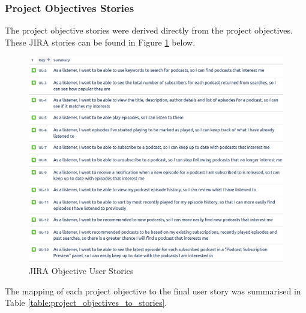 \documentclass[12pt]{article}
\begin{document}
\subsubsection{Project Objectives Stories} \label{sec:project_objectives_stories}

The project objective stories were derived directly from the project objectives. These JIRA stories can be found in Figure \ref{fig:jira_stories} below.

\begin{figure}[ht]
    \centering
    \includegraphics[width=\textwidth]{resources/objective_stories}
    \caption{JIRA Objective User Stories}
    \label{fig:jira_stories}
\end{figure}

The mapping of each project objective to the final user story was summarised in Table \ref{table:project_objectives_to_stories}.
\end{document}
